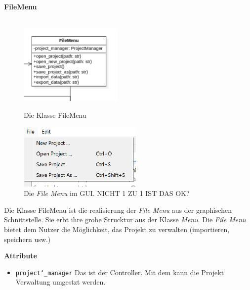 \documentclass{article}
\begin{document}
\newpage
\textbf{\large{FileMenu}}\\\\
\begin{figure}[H]%
    \centering
    \begin{minipage}[b]{0.4\textwidth}
        \includegraphics[width=5cm]{entwurf/Entwurf_dokument/img/Alissa/FileMenu.png}
        \caption{Die Klasse FileMenu}
    \end{minipage}
    \hfill
    \begin{minipage}[b]{0.4\textwidth}
        \includegraphics[width=6cm]{entwurf/Entwurf_dokument/img/Alissa/EditMenuGUI.png} %
    \caption{Die \textit{File Menu} im GUI. NICHT 1 ZU 1 IST DAS OK?}
    \end{minipage}
\end{figure}
Die Klasse FileMenu ist die realisierung der \textit{File Menu} aus der graphischen Schnittstelle. Sie erbt ihre grobe Strucktur aus der Klasse \textit{Menu}. Die \textit{File Menu} bietet dem Nutzer die Möglichkeit, das Projekt zu verwalten (importieren, speichern usw.)
\newline \newline

\textbf{{Attribute}}
\begin{itemize}
\item \texttt{project\char`_manager} \newline Das ist der Controller. Mit dem kann die Projekt Verwaltung umgestzt werden.
\end{itemize}
\end{document}
